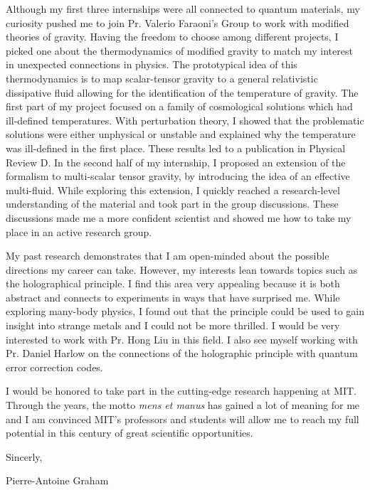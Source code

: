 \documentclass[11pt,a4paper,roman, total={5in, 4in}]{moderncv}
\begin{document}
\newpage 

Although my first three internships were all connected to quantum materials, my curiosity pushed me to join Pr. Valerio Faraoni's Group to work with modified theories of gravity. Having the freedom to choose among different projects, I picked one about the thermodynamics of modified gravity to match my interest in unexpected connections in physics. The prototypical idea of this thermodynamics is to map scalar-tensor gravity to a general relativistic dissipative fluid allowing for the identification of the temperature of gravity. The first part of my project focused on a family of cosmological solutions which had ill-defined temperatures. With perturbation theory, I showed that the problematic solutions were either unphysical or unstable and explained why the temperature was ill-defined in the first place. These results led to a publication in Physical Review D. In the second half of my internship, I proposed an extension of the formalism to multi-scalar tensor gravity, by introducing the idea of an effective multi-fluid. While exploring this extension, I quickly reached a research-level understanding of the material and took part in the group discussions. These discussions made me a more confident scientist and showed me how to take my place in an active research group.  \vspace{0.5cm}   

My past research demonstrates that I am open-minded about the possible directions my career can take. However, my interests lean towards topics such as the holographical principle. I find this area very appealing because it is both abstract and connects to experiments in ways that have surprised me. While exploring many-body physics, I found out that the principle could be used to gain insight into strange metals and I could not be more thrilled. I would be very interested to work with Pr. Hong Liu in this field. I also see myself working with Pr. Daniel Harlow on the connections of the holographic principle with quantum error correction codes.  
\vspace{0.5cm}

I would be honored to take part in the cutting-edge research happening at MIT. Through the years, the motto \textit{mens et manus} has gained a lot of meaning for me and I am convinced MIT's professors and students will allow me to reach my full potential in this century of great scientific opportunities.

\vspace{0.5cm}
Sincerly,

\vspace{0.5cm}
Pierre-Antoine Graham
\end{document}
